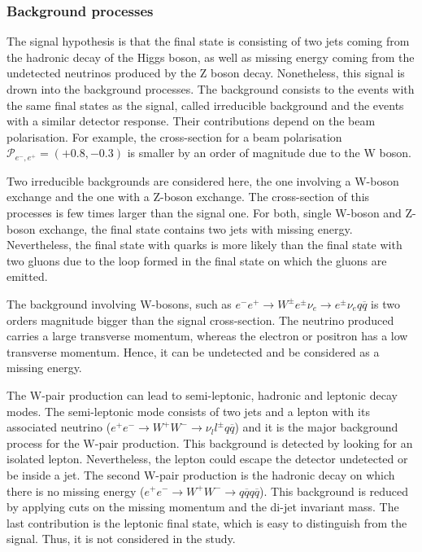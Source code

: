   \subsubsection{Background processes}

    The signal hypothesis is that the final state is consisting of two jets coming from the hadronic decay of the Higgs boson, as well as missing energy coming from the undetected neutrinos produced by the Z boson decay.
    Nonetheless, this signal is drown into the background processes.
    The background consists to the events with the same final states as the signal, called irreducible background and the events with a similar detector response.
    Their contributions depend on the beam polarisation.
    For example, the cross-section for a beam polarisation $\mathcal{P}_{e^-,e^+} = (+0.8,-0.3)$ is smaller by an order of magnitude due to the W boson.

    Two irreducible backgrounds are considered here, the one involving a W-boson exchange and the one with a Z-boson exchange.
    The cross-section of this processes is few times larger than the signal one.
    For both, single W-boson and Z-boson exchange, the final state contains two jets with missing energy.
    Nevertheless, the final state with quarks is more likely than the final state with two gluons due to the loop formed in the final state on which the gluons are emitted.

    The background involving W-bosons, such as $e^{-}e^{+} \rightarrow W^{\pm}e^{\pm}\nu_{e} \rightarrow e^{\pm}\nu_{e}q\overline{q}$ is two orders magnitude bigger than the signal cross-section.
    The neutrino produced carries a large transverse momentum, whereas the electron or positron has a low transverse momentum.
    Hence, it can be undetected and be considered as a missing energy.
    
    The W-pair production can lead to semi-leptonic, hadronic and leptonic decay modes.
    The semi-leptonic mode consists of two jets and a lepton with its associated neutrino ($e^{+}e^{-} \rightarrow W^+W^- \rightarrow \nu_{l}l^{\pm}q\overline{q}$) and it is the major background process for the W-pair production.
    This background is detected by looking for an isolated lepton.
    Nevertheless, the lepton could escape the detector undetected or be inside a jet.
    The second W-pair production is the hadronic decay on which there is no missing energy ($e^{+}e^{-} \rightarrow W^+W^- \rightarrow q\overline{q} q\overline{q}$).
    This background is reduced by applying cuts on the missing momentum and the di-jet invariant mass.
    The last contribution is the leptonic final state, which is easy to distinguish from the signal.
    Thus, it is not considered in the study. 

